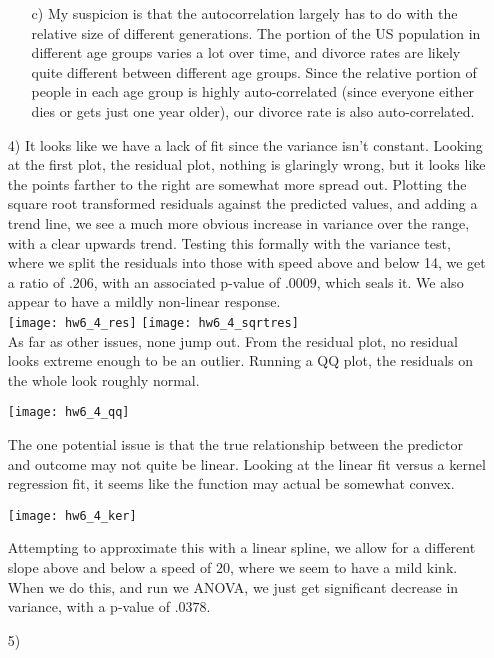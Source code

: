 \documentclass[11pt]{article}
\theoremstyle{definition}
\begin{document}
\begin{itemize}
\begin{itemize}
            \item[c)]
                My suspicion is that the autocorrelation largely has to do with the relative size of different generations. The portion of the US population in different age groups varies a lot over time, and divorce rates are likely quite different between different age groups. Since the relative portion of people in each age group is highly auto-correlated (since everyone either dies or gets just one year older), our divorce rate is also auto-correlated.
        \end{itemize}
    \item[4)]
        It looks like we have a lack of fit since the variance isn't constant. Looking at the first plot, the residual plot, nothing is glaringly wrong, but it looks like the points farther to the right are somewhat more spread out. Plotting the square root transformed residuals against the predicted values, and adding a trend line, we see a much more obvious increase in variance over the range, with a clear upwards trend. Testing this formally with the variance test, where we split the residuals into those with speed above and below 14, we get a ratio of $.206$, with an associated p-value of $.0009$, which seals it. We also appear to have a mildly non-linear response. \\
        \texttt{[image: hw6\_4\_res]} 
        \texttt{[image: hw6\_4\_sqrtres]}  \\
             As far as other issues, none jump out. From the residual plot, no residual looks extreme enough to be an outlier. Running a QQ plot, the residuals on the whole look roughly normal. \\
        \begin{center}
            \texttt{[image: hw6\_4\_qq]} 
        \end{center}
        The one potential issue is that the true relationship between the predictor and outcome may not quite be linear. Looking at the linear fit versus a kernel regression fit, it seems like the function may actual be somewhat convex. 
        \begin{center}
            \texttt{[image: hw6\_4\_ker]} 
        \end{center}
        Attempting to approximate this with a linear spline, we allow for a different slope above and below a speed of $20$, where we seem to have a mild kink. When we do this, and run we ANOVA, we just get significant decrease in variance, with a p-value of $.0378$. \\
        
    \item[5)]


    
\end{itemize}
\end{document}
